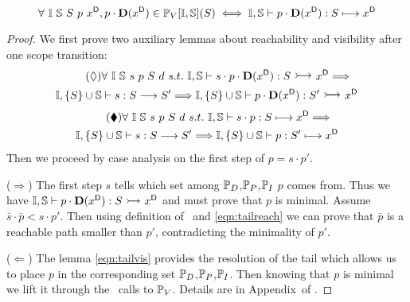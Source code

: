 \begin{lemma} 
\label{lemma:distr}
$$\forall\ \mathbb{I}\ \mathbb{S}\ S\ p\ {x}^{\mbox{\scriptsize\sf D}},
 p \cdot \mbox{\rm\bf{D}}({x}^{\mbox{\scriptsize\sf D}})\in\mathbb{P}_{V}[\mathbb{I},\mathbb{S}](S) \iff \mathbb{I},\mathbb{S} \vdash p \cdot \mbox{\rm\bf{D}}({x}^{\mbox{\scriptsize\sf D}}): S \longmapsto {x}^{\mbox{\scriptsize\sf D}}$$
\end{lemma}
\begin{proof}\vspace*{-.3\baselineskip} 
We first prove two auxiliary lemmas about reachability and visibility after one scope transition:
\vspace*{-3mm}
 \begin{multline}\label{eqn:tailreach}\tag{$\lozenge$}
   \forall\ \seeni\ \seens\ s\ p\ S\ d\ s.t.\ 
   \seeni,\seens \vdash s \cdot p\cdot\dstep{\d{x}} : S \reach \d{x} \Longrightarrow\\
   \seeni,\{S\}\cup\seens \vdash s : S \edge S' \Longrightarrow 
   \seeni,\{S\}\cup\seens \vdash p\cdot\dstep{\d{x}} : S' \reach \d{x}    
  \end{multline}\vspace*{-9mm}
\begin{multline}\label{eqn:tailvis}\tag{$\blacklozenge$}
\forall\ \seeni\ \seens\ s\ p\ S\ d\ s.t.\ 
\seeni,\seens \vdash s \cdot p : S \resolve \d{x} \Longrightarrow \\ 
\seeni,\{S\}\cup\seens \vdash s : S \edge S' \Longrightarrow 
\seeni,\{S\}\cup\seens \vdash p : S' \resolve \d{x}  
\end{multline}
Then we proceed by case analysis on the first step of $p = s\cdot p'$. 

($\Rightarrow$) The first step $s$ tells which set among $\mathbb{P}_{D}$,$\mathbb{P}_{P}$,$\mathbb{P}_{I}$ $p$ comes from.
Thus we have $\seeni,\seens \vdash p \cdot \dstep{\d{x}}: S \reach \d{x}$ and must prove that $p$ is minimal.
Assume $\bar{s}\cdot \bar{p} < s\cdot p'$. Then using definition of \visible\ and  \ref{eqn:tailreach} we can prove that $\bar{p}$ is a reachable path smaller than $p'$, contradicting the minimality of $p'$.\medskip

($\Leftarrow$) The lemma \ref{eqn:tailvis} provides the resolution of the tail which allows us to place $p$ in
the corresponding set $\mathbb{P}_{D}$,$\mathbb{P}_{P}$,$\mathbb{P}_{I}$. Then knowing that $p$
is minimal we lift it through the \visible\ calls to $\mathbb{P}_{V}$. Details are in Appendix~\refproofappendix of \cite{TUD-SERG-2015-001-local}.

\end{proof}

